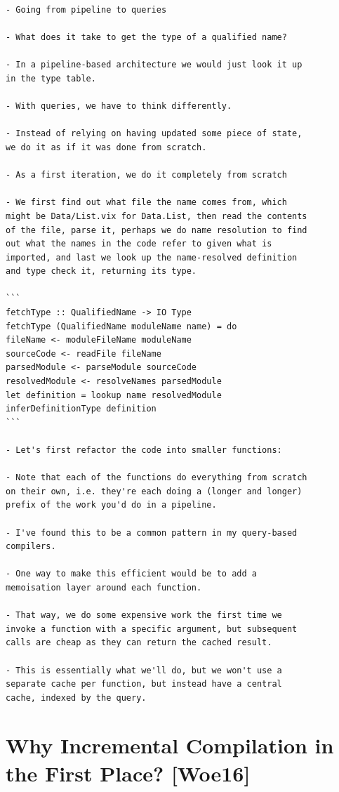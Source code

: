 \begin{verbatim}
- Going from pipeline to queries

- What does it take to get the type of a qualified name?

- In a pipeline-based architecture we would just look it up
in the type table.

- With queries, we have to think differently.

- Instead of relying on having updated some piece of state,
we do it as if it was done from scratch.

- As a first iteration, we do it completely from scratch

- We first find out what file the name comes from, which
might be Data/List.vix for Data.List, then read the contents
of the file, parse it, perhaps we do name resolution to find
out what the names in the code refer to given what is
imported, and last we look up the name-resolved definition
and type check it, returning its type.

```
fetchType :: QualifiedName -> IO Type
fetchType (QualifiedName moduleName name) = do
fileName <- moduleFileName moduleName
sourceCode <- readFile fileName
parsedModule <- parseModule sourceCode
resolvedModule <- resolveNames parsedModule
let definition = lookup name resolvedModule
inferDefinitionType definition
```

- Let's first refactor the code into smaller functions:

- Note that each of the functions do everything from scratch
on their own, i.e. they're each doing a (longer and longer)
prefix of the work you'd do in a pipeline.

- I've found this to be a common pattern in my query-based
compilers.

- One way to make this efficient would be to add a
memoisation layer around each function.

- That way, we do some expensive work the first time we
invoke a function with a specific argument, but subsequent
calls are cheap as they can return the cached result.

- This is essentially what we'll do, but we won't use a
separate cache per function, but instead have a central
cache, indexed by the query.
\end{verbatim}
\cite{olle_query_based}

\section*{Why Incremental Compilation in the First Place? [Woe16]}

